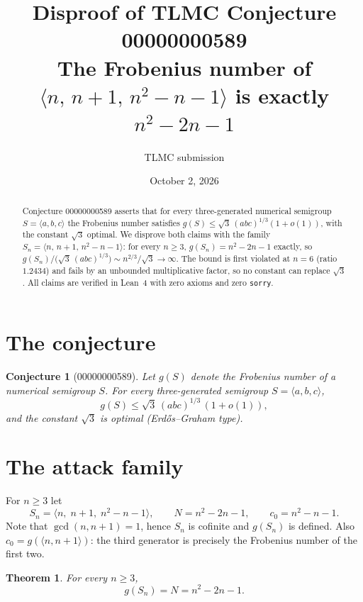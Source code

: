 \documentclass[11pt]{article}
\title{Disproof of TLMC Conjecture 00000000589\\
\large The Frobenius number of $\langle n,\,n{+}1,\,n^2{-}n{-}1\rangle$ is exactly $n^2-2n-1$}
\author{TLMC submission}
\date{October 2, 2026}
\newtheorem{theorem}{Theorem}
\newtheorem{conjecture}{Conjecture}
\begin{document}
\maketitle

\begin{abstract}
Conjecture 00000000589 asserts that for every three-generated numerical
semigroup $S=\langle a,b,c\rangle$ the Frobenius number satisfies
$g(S)\le \sqrt{3}\,(abc)^{1/3}(1+o(1))$, with the constant $\sqrt3$ optimal.
We disprove both claims with the family
$S_n=\langle n,\,n{+}1,\,n^2{-}n{-}1\rangle$: for every $n\ge 3$,
$g(S_n)=n^2-2n-1$ exactly, so
$g(S_n)/\bigl(\sqrt3\,(abc)^{1/3}\bigr)\sim n^{2/3}/\sqrt3\to\infty$.
The bound is first violated at $n=6$ (ratio $1.2434$) and fails by an
unbounded multiplicative factor, so no constant can replace $\sqrt3$.
All claims are verified in Lean~4 with zero axioms and zero \texttt{sorry}.
\end{abstract}

\section{The conjecture}

\begin{conjecture}[00000000589]
Let $g(S)$ denote the Frobenius number of a numerical semigroup $S$. For every
three-generated semigroup $S=\langle a,b,c\rangle$,
\[
g(S)\le \sqrt{3}\,(abc)^{1/3}\,(1+o(1)),
\]
and the constant $\sqrt3$ is optimal (Erd\H{o}s--Graham type).
\end{conjecture}

\section{The attack family}

For $n\ge 3$ let
\[
S_n=\langle n,\; n+1,\; n^2-n-1\rangle,\qquad
N=n^2-2n-1,\qquad c_0=n^2-n-1 .
\]
Note that $\gcd(n,n+1)=1$, hence $S_n$ is cofinite and $g(S_n)$ is defined.
Also $c_0=g(\langle n,n+1\rangle)$: the third generator is precisely the
Frobenius number of the first two.

\begin{theorem}\label{thm:main}
For every $n\ge 3$,
\[
g(S_n)=N=n^2-2n-1 .
\]
\end{theorem}
\end{document}
